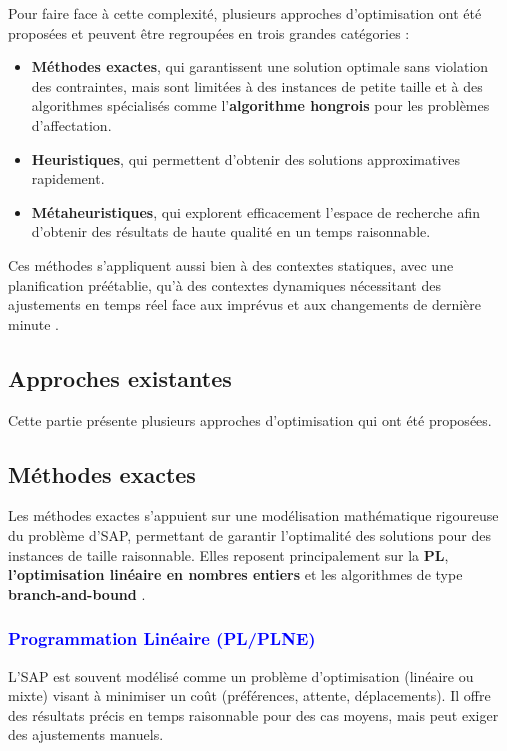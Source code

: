 Pour faire face à cette complexité, plusieurs approches d’optimisation ont été proposées et peuvent être regroupées en trois grandes catégories :
\begin{itemize}
	\item \textbf{Méthodes exactes}, qui garantissent une solution optimale sans violation des contraintes, mais sont limitées à des instances de petite taille et à des algorithmes spécialisés comme l’\textbf{algorithme hongrois} pour les problèmes d’affectation.
	\item \textbf{Heuristiques}, qui permettent d’obtenir des solutions approximatives rapidement.
	\item \textbf{Métaheuristiques}, qui explorent efficacement l’espace de recherche afin d’obtenir des résultats de haute qualité en un temps raisonnable.
\end{itemize}

Ces méthodes s’appliquent aussi bien à des contextes statiques, avec une planification préétablie, qu’à des contextes dynamiques nécessitant des ajustements en temps réel face aux imprévus et aux changements de dernière minute \cite{Cheng_2012}.

\subsection{Approches existantes}

Cette partie présente plusieurs approches d’optimisation qui ont été proposées.

\subsection*{Méthodes exactes}
\vspace{-0.5em}
Les méthodes exactes s’appuient sur une modélisation mathématique rigoureuse du problème d’\ac{SAP}, permettant de garantir l’optimalité des solutions pour des instances de taille raisonnable. Elles reposent principalement sur la \textbf{\ac{PL}}, \textbf{l'optimisation linéaire en nombres entiers} et les algorithmes de type \textbf{branch-and-bound} \cite{Bolat_2001,Li_2021}.
\vspace{-0.5em}
\subsubsection*{\small{\textcolor{blue}{Programmation Linéaire (PL/PLNE)}}}

\label{sec:LP}


L’\ac{SAP} est souvent modélisé comme un problème d’optimisation (linéaire ou mixte) visant à minimiser un coût (préférences, attente, déplacements). Il offre des résultats précis en temps raisonnable pour des cas moyens, mais peut exiger des ajustements manuels.

